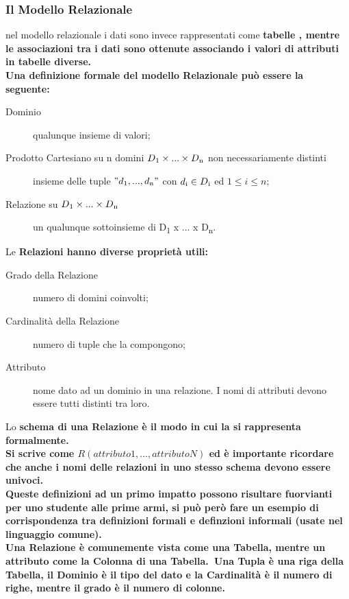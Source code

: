 \documentclass[11pt]{article} %
\begin{document}
\subsubsection{Il Modello Relazionale} nel modello relazionale i dati sono invece rappresentati come \bf tabelle \rm, mentre le associazioni tra i dati sono ottenute associando i \bf valori \rm di attributi in tabelle diverse.\\
Una definizione formale del modello Relazionale può essere la seguente:
\begin{description}
\item[Dominio] qualunque insieme di valori;
\item[Prodotto Cartesiano su n domini \(D\textsubscript 1 \times ... \times D\textsubscript n\) non necessariamente distinti] insieme delle tuple \( "d\textsubscript 1, ... , d\textsubscript n" \) con \( d\textsubscript i  \in D\textsubscript i \) ed \(1 \le i \le n;\)
\item[Relazione su \(D\textsubscript 1 \times ... \times D\textsubscript n\)] un qualunque sottoinsieme di D\textsubscript 1 x ... x D\textsubscript n.
\end{description}
\noindent Le \bf Relazioni \rm hanno diverse proprietà utili:
\begin{description}
\item[Grado della Relazione] numero di domini coinvolti;
\item[Cardinalità della Relazione] numero di tuple che la compongono;
\item[Attributo] nome dato ad un dominio in una relazione. I nomi di attributi devono essere tutti distinti tra loro. 
\end{description}
\noindent Lo \bf schema di una Relazione \rm è il modo in cui la si rappresenta formalmente. \\ Si scrive come \( R(attributo1, ... , attributoN)\) ed è importante ricordare che anche i nomi delle relazioni in uno stesso schema devono essere univoci.\\
Queste definizioni ad un primo impatto possono risultare fuorvianti per uno studente alle prime armi, si può però fare un esempio di corrispondenza tra definizioni formali e definzioni informali (usate nel linguaggio comune).\\
Una \bf Relazione \rm è comunemente vista come una Tabella, mentre un \bf attributo \rm come la Colonna di una Tabella.\ 
Una \bf Tupla \rm è una riga della Tabella, il \bf Dominio \rm è il tipo del dato e la \bf Cardinalità \rm è il numero di righe, mentre il \bf grado \rm è il numero di colonne.
\end{document}
